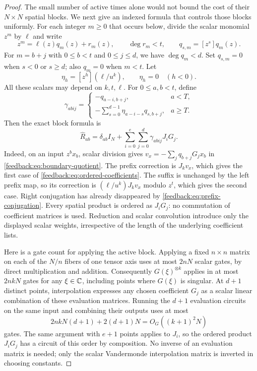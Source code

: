 \begin{proof}
The small number of active times alone would not bound the cost of
their $N\times N$ spatial blocks.  We next give an indexed formula
that controls those blocks uniformly.  For each integer $m\geq0$ that
occurs below, divide the scalar monomial $z^m$ by $\ell$ and write
\[
 z^m=\ell(z)q_m(z)+r_m(z),\qquad \deg r_m<t,
 \qquad q_{s,m}=[z^s]q_m(z).
\]
For $m=b+j$ with $0\leq b<t$ and $0\leq j\leq d$, we have
$\deg q_m<d$.  Set $q_{s,m}=0$ when $s<0$ or $s\geq d$; also
$q_m=0$ when $m<t$.  Let
\[
 \eta_h=[z^h](\ell/u^k),\qquad \eta_h=0\quad(h<0).
\]
All these scalars may depend on $k,t,\ell$.
For $0\leq a,b<t$, define
\begin{equation}
 \gamma_{abij}=
 \begin{cases}
  -q_{a-i,b+j},&a<T,\\[2pt]
  -\displaystyle\sum_{s=0}^{d-1}\eta_{a-i-s}q_{s,b+j},&a\geq T.
 \end{cases}
 \label{feedback:eq:ordered-coefficients}
\end{equation}
Then the exact block formula is
\begin{equation}
 \widehat R_{ab}=\delta_{ab}I_N+
    \sum_{i=0}^{e}\sum_{j=0}^{d}\gamma_{abij}J_iG_j.
 \label{feedback:eq:ordered-span}
\end{equation}
Indeed, on an input $z^bx_b$, scalar division gives
$v_x=-\sum_jq_{b+j}G_jx_b$ in
\cref{feedback:eq:boundary-quotient}.  The prefix correction is $J_kv_x$,
which gives the first case of
\cref{feedback:eq:ordered-coefficients}.  The suffix is unchanged by the
left prefix map, so its correction is $(\ell/u^k)J_kv_x$ modulo $z^t$,
which gives the second case.  Right conjugation has already disappeared
by \cref{feedback:eq:prefix-conjugation}.  Every spatial product is
ordered as $J_iG_j$: no commutation of coefficient matrices is used.
Reduction and scalar convolution introduce only the displayed scalar
weights, irrespective of the length of the underlying coefficient
lists.

Here is a gate count for applying the active block.  Applying a fixed
$n\times n$ matrix on each of the $N/n$ fibers of one tensor axis uses
at most $2nN$ scalar gates, by direct multiplication and addition.
Consequently $G(\xi)^{\otimes k}$ applies in at most $2nkN$ gates for
any $\xi\in\mathbb C$, including points where $G(\xi)$ is singular.  At
$d+1$ distinct points, interpolation expresses any chosen coefficient
$G_j$ as a scalar linear combination of these evaluation matrices.
Running the $d+1$ evaluation circuits on the same input and combining
their outputs uses at most
\[
 2nkN(d+1)+2(d+1)N=O_G((k+1)^2N)
\]
gates.  The same argument with $e+1$ points applies to $J_i$, so the
ordered product $J_iG_j$ has a circuit of this order by composition.
No inverse of an evaluation matrix is needed; only the scalar
Vandermonde interpolation matrix is inverted in choosing constants.


\end{proof}
